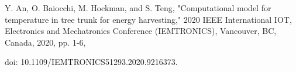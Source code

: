 \documentclass{IEEEtran} %
\begin{document}
\begin{enumerate}[label={[\arabic*]}]
\item Y. An, O. Baiocchi, M. Hockman, and S. Teng, "Computational model for temperature in tree trunk for energy harvesting," 2020 IEEE International IOT, Electronics and Mechatronics Conference (IEMTRONICS), Vancouver, BC, Canada, 2020, pp. 1-6, 

doi: 10.1109/IEMTRONICS51293.2020.9216373.\label{1Dtree}





 


\end{enumerate}



\end{document}
